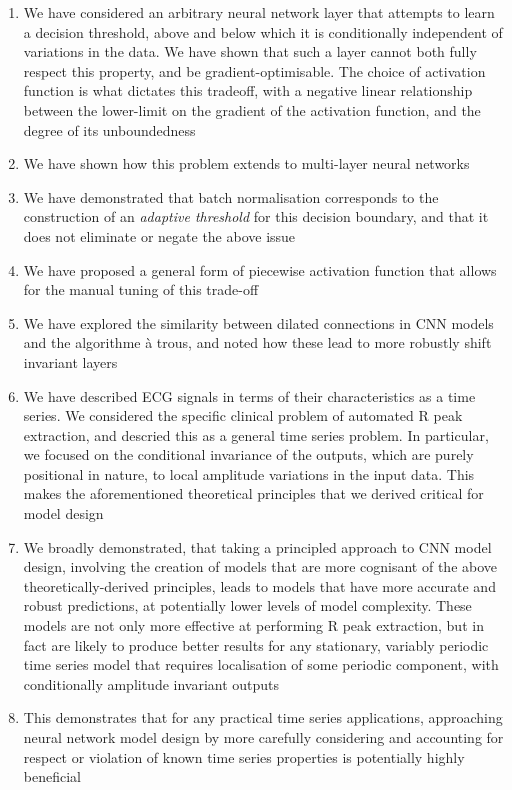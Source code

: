 \documentclass[9pt,conference]{IEEEtran}
\begin{document}
\begin{enumerate}
    \item We have considered an arbitrary neural network layer that attempts to learn a decision threshold, above and below which it is conditionally independent of variations in the data. We have shown that such a layer cannot both fully respect this property, and be gradient-optimisable. The choice of activation function is what dictates this tradeoff, with a negative linear relationship between the lower-limit on the gradient of the activation function, and the degree of its unboundedness
    \item We have shown how this problem extends to multi-layer neural networks
    \item We have demonstrated that batch normalisation corresponds to the construction of an \textit{adaptive threshold} for this decision boundary, and that it does not eliminate or negate the above issue
    \item We have proposed a general form of piecewise activation function that allows for the manual tuning of this trade-off
    \item We have explored the similarity between dilated connections in CNN models and the algorithme à trous, and noted how these lead to more robustly shift invariant layers
    \item We have described ECG signals in terms of their characteristics as a time series. We considered the specific clinical problem of automated R peak extraction, and descried this as a general time series problem. In particular, we focused on the conditional invariance of the outputs, which are purely positional in nature, to local amplitude variations in the input data. This makes the aforementioned theoretical principles that we derived critical for model design
    \item We broadly demonstrated, that taking a principled approach to CNN model design, involving the creation of models that are more cognisant of the above theoretically-derived principles, leads to models that have more accurate and robust predictions, at potentially lower levels of model complexity. These models are not only more effective at performing R peak extraction, but in fact are likely to produce better results for any stationary, variably periodic time series model that requires localisation of some periodic component, with conditionally amplitude invariant outputs  
    \item This demonstrates that for any practical time series applications, approaching neural network model design by more carefully considering and accounting for respect or violation of known time series properties is potentially highly beneficial
\end{enumerate}
\end{document}
